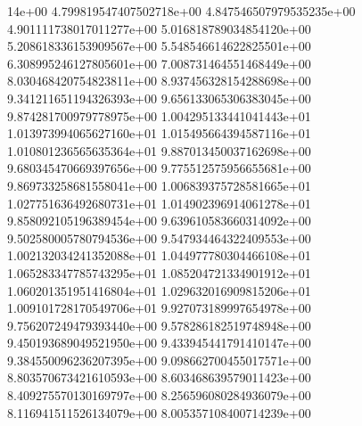 14e+00	4.799819547407502718e+00	4.847546507979535235e+00	4.901111738017011277e+00	5.016818789034854120e+00	5.208618336153909567e+00	5.548546614622825501e+00	6.308995246127805601e+00	7.008731464551468449e+00	8.030468420754823811e+00	8.937456328154288698e+00	9.341211651194326393e+00	9.656133065306383045e+00	9.874281700979778975e+00	1.004295133441041443e+01	1.013973994065627160e+01	1.015495664394587116e+01	1.010801236565635364e+01	9.887013450037162698e+00	9.680345470669397656e+00	9.775512575956655681e+00	9.869733258681558041e+00	1.006839375728581665e+01	1.027751636492680731e+01	1.014902396914061278e+01	9.858092105196389454e+00	9.639610583660314092e+00	9.502580005780794536e+00	9.547934464322409553e+00	1.002132034241352088e+01	1.044977780304466108e+01	1.065283347785743295e+01	1.085204721334901912e+01	1.060201351951416804e+01	1.029632016909815206e+01	1.009101728170549706e+01	9.927073189997654978e+00	9.756207249479393440e+00	9.578286182519748948e+00	9.450193689049521950e+00	9.433945441791410147e+00	9.384550096236207395e+00	9.098662700455017571e+00	8.803570673421610593e+00	8.603468639579011423e+00	8.409275570130169797e+00	8.256596080284936079e+00	8.116941511526134079e+00	8.005357108400714239e+00
